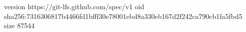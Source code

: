 version https://git-lfs.github.com/spec/v1
oid sha256:7316306817b4466fd1bfff30e78001ebd8a330eb167d2f242ca790cb1fa5fbd5
size 87544
